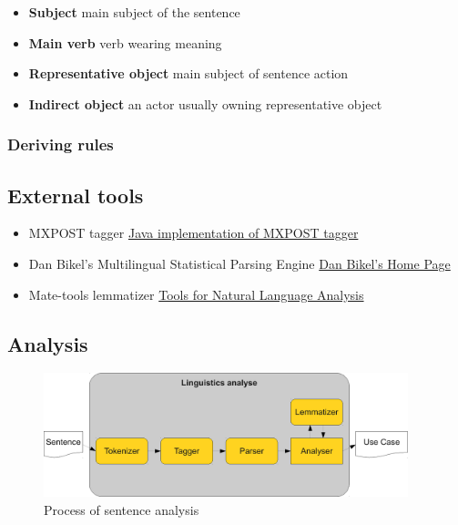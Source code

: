 \begin{itemize}
\item {\bf Subject} main subject of the sentence
\item {\bf Main verb} verb wearing meaning
\item {\bf Representative object} main subject of sentence action
\item {\bf Indirect object} an actor usually owning representative object
\end{itemize}

\subsubsection{Deriving rules}

\subsection{External tools}
\label{sec:externaltools}

\begin{itemize}
\item MXPOST tagger \href{http://www.inf.ed.ac.uk/resources/nlp/local_doc/MXPOST.html}{Java implementation of MXPOST tagger}
\item Dan Bikel's Multilingual Statistical Parsing Engine \href{http://www.cis.upenn.edu/~dbikel/software.html#stat-parser}{Dan Bikel’s Home Page}
\item Mate-tools lemmatizer \href{http://code.google.com/p/mate-tools/}{Tools for Natural Language Analysis}
\end{itemize}

\subsection{Analysis}
\label{sec:analysis}

\begin{figure}[ht]
  \centering
  \includegraphics[width=300pt]{images/LinguisticsAnalyse}
  \caption{Process of sentence analysis}
  \label{fig:LinguisticsAnalyse}
\end{figure}

